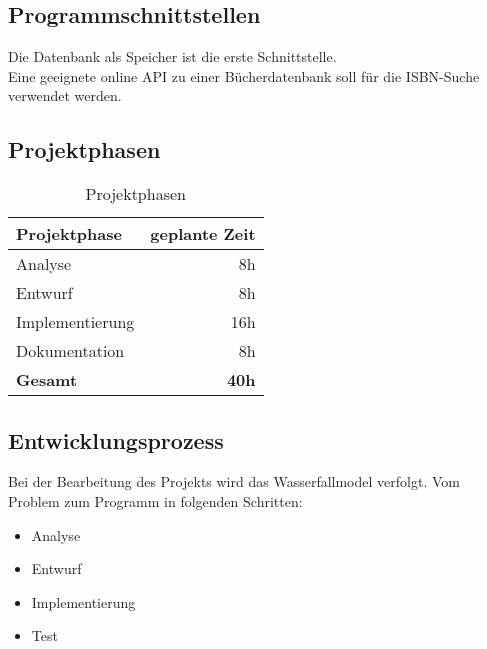\subsection{Programmschnittstellen}
Die Datenbank als Speicher ist die erste Schnittstelle.\\
Eine geeignete online API zu einer Bücherdatenbank soll für die ISBN-Suche verwendet werden.

\subsection{Projektphasen}
\begin{center}
\begin{table} [htb] %
\centering
\begin{tabular}{  l  r  }
\hline
\rowcolor{cyan}\textbf{Projektphase}&\textbf{geplante Zeit}\\
\hline
Analyse&8h\\
\rowcolor{lightgray}Entwurf&8h\\
Implementierung&16h\\
\rowcolor{lightgray}Dokumentation&8h\\
\hline
\textbf{Gesamt}&\textbf{40h}\\
\hline
\end{tabular}
\caption{Projektphasen}
\label{tab:Projektphasen}
\end{table}
\end{center}

\subsection{Entwicklungsprozess}
Bei der Bearbeitung des Projekts wird das Wasserfallmodel verfolgt.
Vom Problem zum Programm in folgenden Schritten:
\begin{itemize}
\item{Analyse}
\item{Entwurf}
\item{Implementierung}
\item{Test}
\end{itemize}